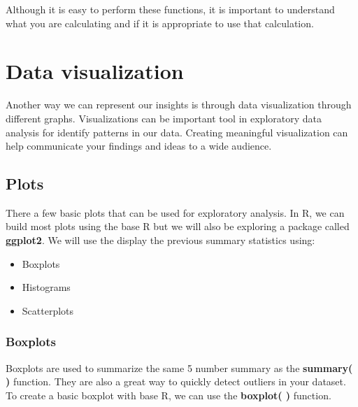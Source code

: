 \documentclass[
]{book}
\newenvironment{Shaded}{\begin{snugshade}}{\end{snugshade}}
\newcommand{\FunctionTok}[1]{\textcolor[rgb]{0.00,0.00,0.00}{#1}}
\newcommand{\NormalTok}[1]{#1}
\newcommand{\SpecialCharTok}[1]{\textcolor[rgb]{0.00,0.00,0.00}{#1}}
\begin{document}
Although it is easy to perform these functions, it is important to understand what you are calculating and if it is appropriate to use that calculation.

\hypertarget{data-visualization}{%
\chapter{Data visualization}\label{data-visualization}}

Another way we can represent our insights is through data visualization through different graphs. Visualizations can be important tool in exploratory data analysis for identify patterns in our data. Creating meaningful visualization can help communicate your findings and ideas to a wide audience.

\hypertarget{plots}{%
\section{Plots}\label{plots}}

There a few basic plots that can be used for exploratory analysis. In R, we can build most plots using the base R but we will also be exploring a package called \textbf{ggplot2}. We will use the display the previous summary statistics using:

\begin{itemize}
\item
  Boxplots
\item
  Histograms
\item
  Scatterplots
\end{itemize}

\hypertarget{boxplots}{%
\subsection{Boxplots}\label{boxplots}}

Boxplots are used to summarize the same 5 number summary as the \textbf{summary( )} function. They are also a great way to quickly detect outliers in your dataset. To create a basic boxplot with base R, we can use the \textbf{boxplot( )} function.

\begin{Shaded}
\end{Shaded}
\end{document}
